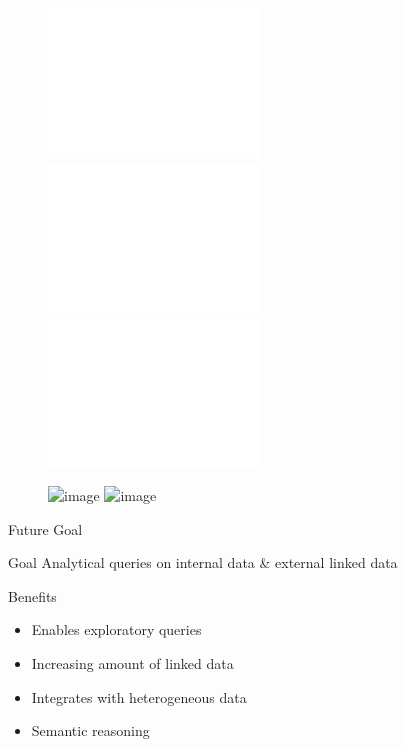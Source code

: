 \section{\intro}
\begin{frame}{\intro}
\begin{figure}
    \includegraphics<+>[trim=0 680 225 0,clip,width=0.5\textwidth]{images/motivation_top-00.pdf}
    \includegraphics<+>[trim=0 680 225 0,clip,width=0.5\textwidth]{images/motivation_top-01.pdf}
    \includegraphics<+->[trim=0 680 225 0,clip,width=0.5\textwidth]{images/motivation_top-1.pdf}
\end{figure}
\begin{figure}
    \includegraphics<5>[trim=0 500 200 0,clip,width=0.5\textwidth]{images/motivation_left-2}
    \includegraphics<6>[trim=0 500 200 0,clip,width=0.5\textwidth]{images/motivation_left-3}
\end{figure}

\end{frame}


\begin{frame}{Future Goal}
\begin{block}{Goal}
Analytical queries on internal data \& external linked data
\end{block}
\pause
\begin{block}{Benefits}
\begin{itemize}
    \item Enables exploratory queries
    \item Increasing amount of linked data
    \item Integrates with heterogeneous data
    \item Semantic reasoning
\end{itemize}
\end{block}
\end{frame}


